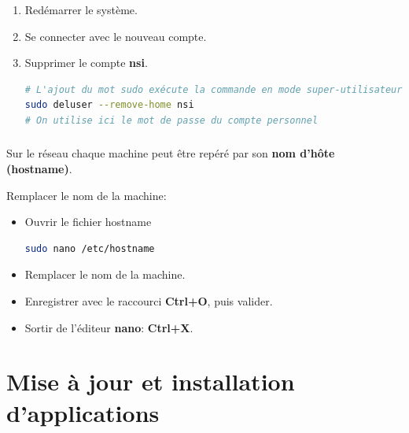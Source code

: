 \documentclass[svgnames,11pt]{beamer}
\begin{document}
\begin{frame}[fragile]
    \frametitle{}

\begin{activite}
\begin{enumerate}
\item Redémarrer le système.
\item Se connecter avec le nouveau compte.
\item Supprimer le compte \textbf{nsi}.
\begin{lstlisting}[language=bash, basicstyle=\ttfamily\small, xleftmargin=1em, xrightmargin=0em]
# L'ajout du mot sudo exécute la commande en mode super-utilisateur.
sudo deluser --remove-home nsi
# On utilise ici le mot de passe du compte personnel
\end{lstlisting}
\end{enumerate}
\end{activite}   

\end{frame}
\begin{frame}[fragile]
    \frametitle{}
    Sur le réseau chaque machine peut être repéré par son \textbf{nom d'hôte (hostname)}.
\begin{activite}
    Remplacer le nom de la machine:
    \begin{itemize}
        \item Ouvrir le fichier hostname
\begin{lstlisting}[language=bash, basicstyle=\ttfamily\small, xleftmargin=1em, xrightmargin=1em]
sudo nano /etc/hostname
\end{lstlisting}
\item Remplacer le nom de la machine.
\item Enregistrer avec le raccourci \textbf{Ctrl+O}, puis valider.
\item Sortir de l'éditeur \textbf{nano}: \textbf{Ctrl+X}.
    \end{itemize}
\end{activite}

\end{frame}
\section{Mise à jour et installation d'applications}
\end{document}
